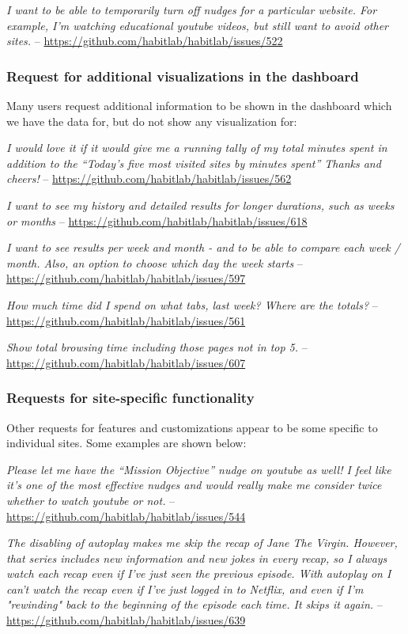 \textit{I want to be able to temporarily turn off nudges for a particular website. For example, I'm watching educational youtube videos, but still want to avoid other sites.} -- \url{https://github.com/habitlab/habitlab/issues/522}

\subsubsection{Request for additional visualizations in the dashboard}

Many users request additional information to be shown in the dashboard which we have the data for, but do not show any visualization for:

\textit{I would love it if it would give me a running tally of my total minutes spent in addition to the ``Today's five most visited sites by minutes spent'' Thanks and cheers!} -- \url{https://github.com/habitlab/habitlab/issues/562}

\textit{I want to see my history and detailed results for longer durations, such as weeks or months} -- \url{https://github.com/habitlab/habitlab/issues/618}

\textit{I want to see results per week and month - and to be able to compare each week / month. Also, an option to choose which day the week starts} -- \url{https://github.com/habitlab/habitlab/issues/597}

\textit{How much time did I spend on what tabs, last week? Where are the totals?} -- \url{https://github.com/habitlab/habitlab/issues/561}

\textit{Show total browsing time including those pages not in top 5.} -- \url{https://github.com/habitlab/habitlab/issues/607}

\subsubsection{Requests for site-specific functionality}

Other requests for features and customizations appear to be some specific to individual sites. Some examples are shown below:

\textit{Please let me have the ``Mission Objective'' nudge on youtube as well! I feel like it's one of the most effective nudges and would really make me consider twice whether to watch youtube or not.} -- \url{https://github.com/habitlab/habitlab/issues/544}

\textit{The disabling of autoplay makes me skip the recap of Jane The Virgin. However, that series includes new information and new jokes in every recap, so I always watch each recap even if I've just seen the previous episode. With autoplay on I can't watch the recap even if I've just logged in to Netflix, and even if I'm "rewinding" back to the beginning of the episode each time. It skips it again.} -- \url{https://github.com/habitlab/habitlab/issues/639}

